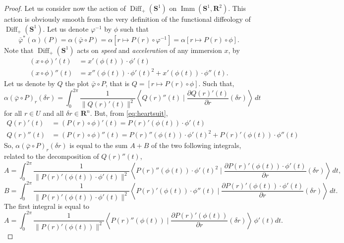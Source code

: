 \documentclass[10pt,reqno,twoside]{amsart}
\DeclareMathOperator{\Diff}{Diff}
\DeclareMathOperator{\Imm}{Imm}
\theoremstyle{plain}
\theoremstyle{definition}
\begin{document}
\begin{proof}
    Let us consider now the action of $\Diff_+(\mathbf{S}^1)$ on $\Imm(\mathbf{S}^1,\mathbf{R}^2)$.
    This action is obviously smooth from the very definition of the functional diffeology of $\Diff_+({\mathbf{S}}^1)$.
    Let us denote $\varphi^{-1}$ by $\phi$ such that
    \[
    \bar{\varphi}^*(\alpha)(P) = \alpha(\bar{\varphi} \circ P) = \alpha[r \mapsto P(r) \circ \varphi^{-1}] = \alpha[r \mapsto P(r) \circ \phi].
    \]
    Note that $\Diff_+({\mathbf{S}}^1)$ acts on \emph{speed} and \emph{acceleration} of any immersion $x$,
    by
    \begin{equation}
      \label{eq:heartsuit}
      \begin{aligned}
        (x \circ \phi)'(t) & = x'(\phi(t))\cdot \phi'(t) \\
        (x \circ \phi)''(t) & = x''(\phi(t))\cdot \phi'(t)^2 + x'(\phi(t)) \cdot\phi''(t).
      \end{aligned}
    \end{equation}
    Let us denote by $Q$ the plot $\bar{\varphi} \circ P$,
    that is $Q = [r \mapsto P(r) \circ \phi]$.
    Such that,
    \[
    \alpha(\bar{\varphi} \circ P)_r(\delta r) = \int_0^{2\pi} \frac{1}{\lVert Q(r)'(t)\rVert^2} \left\langle Q(r)''(t) \mid \frac{\partial Q(r)'(t)}{\partial r} (\delta r)\right\rangle \, dt
    \]
    for all $r \in U$ and all $\delta r \in \mathbf{R}^n$.
    But,
    from \eqref{eq:heartsuit},
    \begin{align*}
      {Q}(r)'(t) & = (P(r) \circ \phi)'(t) = P(r)'(\phi(t))\cdot \phi'(t) \\
      {Q}(r)''(t) & = (P(r) \circ \phi)''(t) = P(r)''(\phi(t))\cdot \phi'(t)^2 + P(r)'(\phi(t))\cdot \phi''(t)
    \end{align*}
    So,
    $\alpha(\bar{\varphi} \circ P)_r(\delta r)$ is equal to the sum $A + B$ of the two following integrals,
    related to the decomposition of $Q(r)''(t)$,
    \[
    A = \int_0^{2\pi} \frac{1}{\lVert P(r)'(\phi(t)) \cdot \phi'(t)\rVert^2} \left\langle P(r)''(\phi(t))\cdot \phi'(t)^2 \mid \frac{\partial P(r)'(\phi(t)) \cdot \phi'(t)}{\partial r}(\delta r) \right\rangle \, dt,
    \]
    \[
    B = \int_0^{2\pi} \frac{1}{\lVert P(r)'(\phi(t)) \cdot \phi'(t)\rVert^2} \left\langle P(r)'(\phi(t)) \cdot \phi''(t) \mid \frac{\partial P(r)'(\phi(t)) \cdot \phi'(t)}{\partial r}(\delta r) \right\rangle \, dt.
    \]
    The first integral is equal to
    \[
    A = \int_0^{2\pi} \frac{1}{\lVert P(r)'(\phi(t))\rVert^2} \left\langle P(r)''(\phi(t)) \mid \frac{\partial P(r)'(\phi(t))}{\partial r}(\delta r) \right\rangle \, \phi'(t) dt.
\]
\end{proof}
\end{document}
